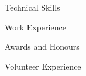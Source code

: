 \documentclass{resume} %
\begin{document}
\begin{rSection}{Technical Skills}

\skills{}

\end{rSection}


\begin{rSection}{Work Experience}

\job{}


\end{rSection}



\begin{rSection}{Awards and Honours} \itemsep -2pt

\award{}
\award{}
\award{}

\end{rSection}



\begin{rSection}{Volunteer Experience} \itemsep -3pt
\job{}


\end{rSection}
\end{document}
